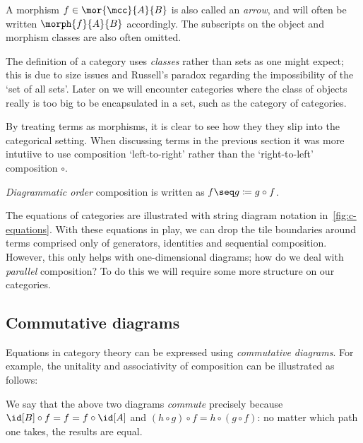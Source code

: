 A morphism \(f \in \mor{\mcc}{A}{B}\) is also called an \emph{arrow}, and will
often be written \(\morph{f}{A}{B}\) accordingly.
The subscripts on the object and morphism classes are also often omitted.

\begin{remark}
    The definition of a category uses \emph{classes} rather than sets as one
    might expect; this is due to size issues and Russell's paradox regarding
    the impossibility of the `set of all sets'.
    Later on we will encounter categories where the class of objects really is
    too big to be encapsulated in a set, such as the category of categories.
\end{remark}

By treating terms as morphisms, it is clear to see how they they slip into the
categorical setting.
When discussing terms in the previous section it was more intutiive to use
composition `left-to-right' rather than the `right-to-left' composition
\(\circ\).

\begin{notation}
    \emph{Diagrammatic order} composition is written as
    \(f \seq g \coloneqq g \circ f\).
\end{notation}



The equations of categories are illustrated with string diagram notation
in~\cref{fig:c-equations}.
With these equations in play, we can drop the tile boundaries around terms
comprised only of generators, identities and sequential composition.
However, this only helps with one-dimensional diagrams; how do we deal with
\emph{parallel} composition?
To do this we will require some more structure on our categories.

\subsection{Commutative diagrams}

Equations in category theory can be expressed using \emph{commutative diagrams}.
For example, the unitality and associativity of composition can be illustrated
as follows:

\begin{center}
    
    \quad
    
\end{center}

We say that the above two diagrams \emph{commute} precisely because \(
\id[B] \circ f = f = f \circ \id[A]
\) and \((h \circ g) \circ f = h \circ (g \circ f)\): no matter which path one
takes, the results are equal.

